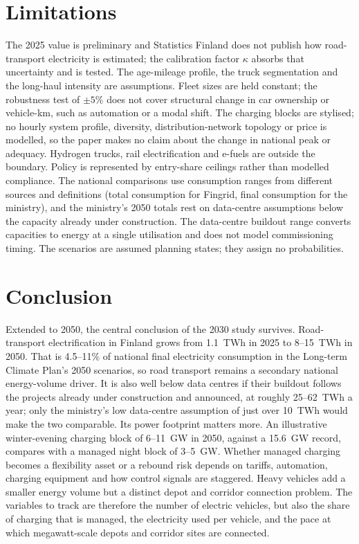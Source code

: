 \documentclass[11pt,a4paper]{article}
\begin{document}
\section{Limitations}
The 2025 value is preliminary and Statistics Finland does not publish how road-transport electricity is estimated; the calibration factor $\kappa$ absorbs that uncertainty and is tested. The age-mileage profile, the truck segmentation and the long-haul intensity are assumptions. Fleet sizes are held constant; the robustness test of $\pm5\%$ does not cover structural change in car ownership or vehicle-km, such as automation or a modal shift. The charging blocks are stylised; no hourly system profile, diversity, distribution-network topology or price is modelled, so the paper makes no claim about the change in national peak or adequacy. Hydrogen trucks, rail electrification and e-fuels are outside the boundary. Policy is represented by entry-share ceilings rather than modelled compliance. The national comparisons use consumption ranges from different sources and definitions (total consumption for Fingrid, final consumption for the ministry), and the ministry's 2050 totals rest on data-centre assumptions below the capacity already under construction. The data-centre buildout range converts capacities to energy at a single utilisation and does not model commissioning timing. The scenarios are assumed planning states; they assign no probabilities.

\section{Conclusion}
Extended to 2050, the central conclusion of the 2030 study survives. Road-transport electrification in Finland grows from 1.1~TWh in 2025 to 8--15~TWh in 2050. That is 4.5--11\% of national final electricity consumption in the Long-term Climate Plan's 2050 scenarios, so road transport remains a secondary national energy-volume driver. It is also well below data centres if their buildout follows the projects already under construction and announced, at roughly 25--62~TWh a year; only the ministry's low data-centre assumption of just over 10~TWh would make the two comparable. Its power footprint matters more. An illustrative winter-evening charging block of 6--11~GW in 2050, against a 15.6~GW record, compares with a managed night block of 3--5~GW. Whether managed charging becomes a flexibility asset or a rebound risk depends on tariffs, automation, charging equipment and how control signals are staggered. Heavy vehicles add a smaller energy volume but a distinct depot and corridor connection problem. The variables to track are therefore the number of electric vehicles, but also the share of charging that is managed, the electricity used per vehicle, and the pace at which megawatt-scale depots and corridor sites are connected.
\end{document}
